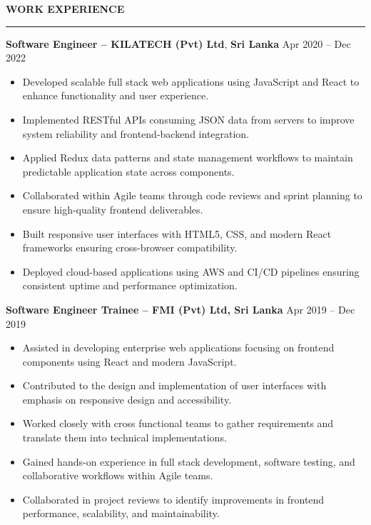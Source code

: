 \documentclass[10pt,letterpaper]{article}
\begin{document}
\textbf{WORK EXPERIENCE}\\[-8pt]
\noindent\rule{\textwidth}{1pt}

\vspace{-2pt}

\textbf{Software Engineer -- KILATECH (Pvt) Ltd}, \textbf{Sri Lanka} \hfill Apr 2020 -- Dec 2022

\vspace{-1pt}

\begin{itemize}
\item Developed scalable full stack web applications using JavaScript and React to enhance functionality and user experience.
\item Implemented RESTful APIs consuming JSON data from servers to improve system reliability and frontend-backend integration.
\item Applied Redux data patterns and state management workflows to maintain predictable application state across components.
\item Collaborated within Agile teams through code reviews and sprint planning to ensure high-quality frontend deliverables.
\item Built responsive user interfaces with HTML5, CSS, and modern React frameworks ensuring cross-browser compatibility.
\item Deployed cloud-based applications using AWS and CI/CD pipelines ensuring consistent uptime and performance optimization.
\end{itemize}

\textbf{Software Engineer Trainee -- FMI (Pvt) Ltd, Sri Lanka} \hfill Apr 2019 -- Dec 2019

\vspace{-1pt}

\begin{itemize}
\item Assisted in developing enterprise web applications focusing on frontend components using React and modern JavaScript.
\item Contributed to the design and implementation of user interfaces with emphasis on responsive design and accessibility.
\item Worked closely with cross functional teams to gather requirements and translate them into technical implementations.
\item Gained hands-on experience in full stack development, software testing, and collaborative workflows within Agile teams.
\item Collaborated in project reviews to identify improvements in frontend performance, scalability, and maintainability.
\end{itemize}
\end{document}
